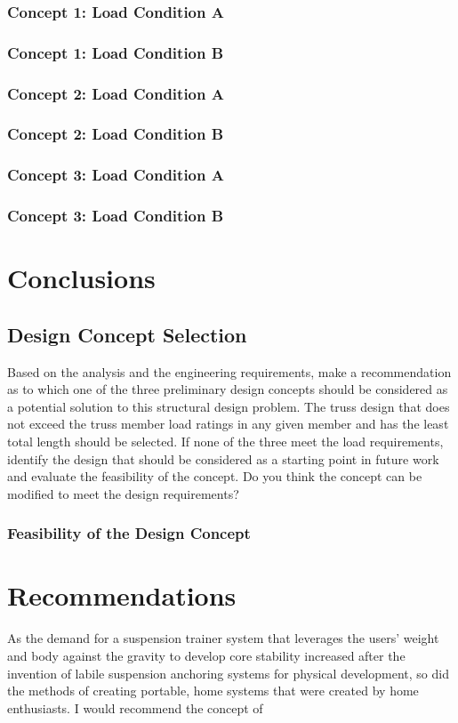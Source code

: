 \subsection{Concept 1: Load Condition A}
\subsection{Concept 1: Load Condition B}

\subsection{Concept 2: Load Condition A}
\subsection{Concept 2: Load Condition B}

\subsection{Concept 3: Load Condition A}
\subsection{Concept 3: Load Condition B}

\chapter{Conclusions}
\section{Design Concept Selection}
Based on the analysis and the engineering requirements, make a recommendation as to which one of the three preliminary design concepts should be considered as a potential solution to this structural design problem. The truss design that does not exceed the truss member load ratings in any given member and has the least total length should be selected. If none of the three meet the load requirements, identify the design that should be considered as a starting point in future work and evaluate the feasibility of the concept. Do you think the concept can be modified to meet the design requirements?
\subsection{Feasibility of the Design Concept}
\chapter{Recommendations}
As the demand for a suspension trainer system that leverages the users' weight and body against the gravity to develop core stability increased after the invention of labile suspension anchoring systems for physical development, so did the methods of creating portable, home systems that were created by home enthusiasts. I would recommend the concept of 